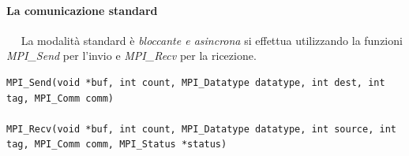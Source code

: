\paragraph{La comunicazione standard}~\newline~\newline
La modalità standard è \emph{bloccante e asincrona} si effettua utilizzando la funzioni \textit{MPI\_Send} per l'invio e \textit{MPI\_Recv} per la ricezione.\\
\begin{lstlisting}[label={lst:mpi_send_recv},
caption={Intestazioni delle primitive di comunicazione MPI}]
MPI_Send(void *buf, int count, MPI_Datatype datatype, int dest, int tag, MPI_Comm comm)
         
MPI_Recv(void *buf, int count, MPI_Datatype datatype, int source, int tag, MPI_Comm comm, MPI_Status *status)
\end{lstlisting}


